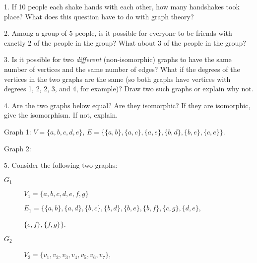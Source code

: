\documentclass[10pt,]{book}
\theoremstyle{plain}
\theoremstyle{definition}
\numberwithin{equation}{chapter}
\newcommand{\vtx}[2]{node[fill,circle,inner sep=0pt, minimum size=4pt,label=#1:#2]{}}
\newcommand{\vr}[1]{\vtx{right}{#1}}
\newcommand{\vl}[1]{\vtx{left}{#1}}
\begin{document}
\begin{exerciselist}
\item[1.]\hypertarget{exercise-274}{}
			If 10 people each shake hands with each other, how many handshakes took place? What does this question have to do with graph theory?
\par\smallskip
\item[2.]\hypertarget{exercise-275}{}
			Among a group of 5 people, is it possible for everyone to be friends with exactly 2 of the people in the group? What about 3 of the people in the group?
\par\smallskip
\item[3.]\hypertarget{exercise-276}{}
			Is it possible for two \emph{different} (non-isomorphic) graphs to have the same number of vertices and the same number of edges? What if the degrees of the vertices in the two graphs are the same (so both graphs have vertices with degrees 1, 2, 2, 3, and 4, for example)? Draw two such graphs or explain why not.
\par\smallskip
\item[4.]\hypertarget{exercise-277}{}
			Are the two graphs below equal? Are they isomorphic? If they are isomorphic, give the isomorphism.  If not, explain.
\par

			Graph 1: \(V = \{a,b,c,d,e\}\), \(E = \{\{a,b\}, \{a,c\}, \{a,e\}, \{b,d\}, \{b,e\}, \{c,e\}\}\).
\par

			Graph 2:
			{
}


\par\smallskip
\item[5.]\hypertarget{exercise-278}{}
			Consider the following two graphs:
		\leavevmode%
\begin{description}
\item[\(G_1\)]\hypertarget{li-765}{}\(V_1=\{a,b,c,d,e,f,g\}\)%
\par
\(E_1=\{\{a,b\},\{a,d\},\{b,c\},\{b,d\},\{b,e\},\{b,f\},\{c,g\},\{d,e\},\)%
\par
\(\{e,f\},\{f,g\}\}\).%
\item[\(G_2\)]\hypertarget{li-766}{}\(V_2=\{v_1,v_2,v_3,v_4,v_5,v_6,v_7\}\),%
\par


\end{description}
\end{exerciselist}
\end{document}
